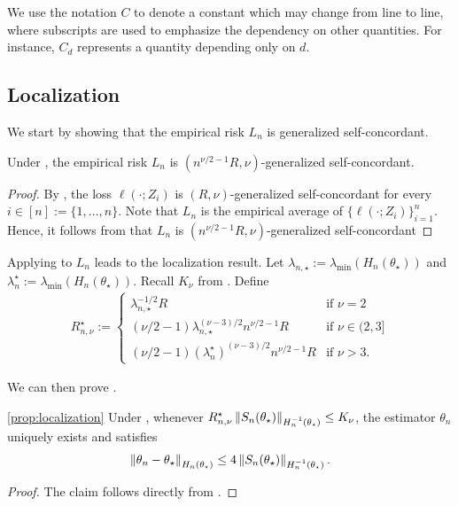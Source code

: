 We use the notation $C$ to denote a constant which may change from line to line, where subscripts are used to emphasize the dependency on other quantities.
For instance, $C_d$ represents a quantity depending only on $d$.

\subsection{Localization}
\label{sub:appendix:local}

We start by showing that the empirical risk $L_n$ is generalized self-concordant.
\begin{lemma}\label{lem:emp_risk_self_concordance}
    Under , the empirical risk $L_n$ is $(n^{\nu/2-1} R, \nu)$-generalized self-concordant.
\end{lemma}
\begin{proof}
    By , the loss $\ell(\cdot; Z_i)$ is $(R, \nu)$-generalized self-concordant for every $i \in [n] := \{1, \dots, n\}$.
    Note that $L_n$ is the empirical average of $\{\ell(\cdot; Z_i)\}_{i=1}^n$.
    Hence, it follows from \cite[Prop.~1]{sun2019generalized} that $L_n$ is $(n^{\nu/2-1}R, \nu)$-generalized self-concordant
\end{proof}

Applying  to $L_n$ leads to the localization result.
Let $\lambda_{n,\star} := \lambda_{\min}(H_n(\theta_\star))$ and $\lambda_n^\star := \lambda_{\min}(H_n(\theta_\star))$.
Recall $K_\nu$ from .
Define
\begin{align}\label{eq:R_n_nu_star}
    R_{n, \nu}^\star :=
    \begin{cases}
        \lambda_{n,\star}^{-1/2} R & \mbox{if } \nu = 2 \\
        (\nu/2 -1) \lambda_{n,\star}^{(\nu - 3)/2} n^{\nu/2-1} R & \mbox{if } \nu \in (2, 3] \\
        (\nu/2 - 1) (\lambda_{n}^\star)^{(\nu - 3)/2} n^{\nu/2-1} R & \mbox{if } \nu > 3.
    \end{cases}
\end{align}

We can then prove .
\begin{customprop}{\ref{prop:localization}}
    Under ,
    whenever $R_{n,\nu}^\star \left\lVert S_n(\theta_\star) \right\rVert_{H_n^{-1}(\theta_\star)} \le K_\nu$,
    the estimator $\theta_n$ uniquely exists and satisfies
    \begin{align*}
        \left\lVert \theta_n - \theta_\star \right\rVert_{H_n(\theta_\star)} \le 4 \left\lVert S_n(\theta_\star) \right\rVert_{H_n^{-1}(\theta_\star)}.
    \end{align*}
\end{customprop}
\begin{proof}
    The claim follows directly from .
\end{proof}

